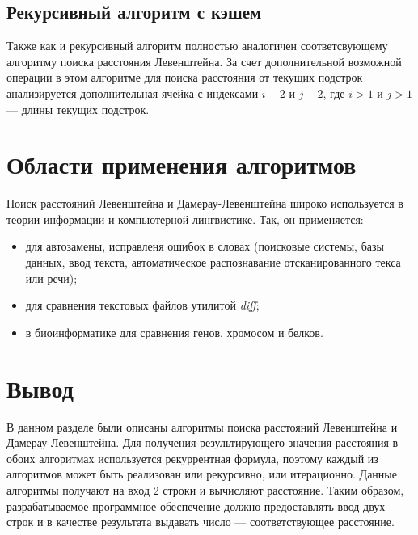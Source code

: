 \subsection{Рекурсивный алгоритм с кэшем}

Также как и рекурсивный алгоритм полностью аналогичен соответсвующему алгоритму
поиска расстояния Левенштейна. За счет дополнительной возможной операции
в этом алгоритме для поиска расстояния от текущих подстрок анализируется 
дополнительная ячейка с индексами $i - 2$ и $j - 2$, где $i > 1$ и $j > 1$ ---
длины текущих подстрок.

\section{Области применения алгоритмов}

Поиск расстояний Левенштейна и Дамерау-Левенштейна широко используется в теории
информации и компьютерной лингвистике. Так, он применяется:
\begin{itemize}
    \item для автозамены, исправленя ошибок в словах (поисковые системы, базы
          данных, ввод текста, автоматическое распознавание отсканированного
          текса или речи);
    \item для сравнения текстовых файлов утилитой \textit{diff};
    \item в биоинформатике для сравнения генов, хромосом и белков.
\end{itemize}

\section{Вывод}

В данном разделе были описаны алгоритмы поиска расстояний Левенштейна и
Дамерау-Левенштейна. Для получения результирующего значения расстояния в обоих
алгоритмах используется рекуррентная формула, поэтому каждый из алгоритмов
может быть реализован или рекурсивно, или итерационно. Данные алгоритмы
получают на вход 2 строки и вычисляют расстояние. Таким образом,
разрабатываемое программное обеспечение должно предоставлять ввод двух
строк и в качестве результата выдавать число --- соответствующее расстояние.
